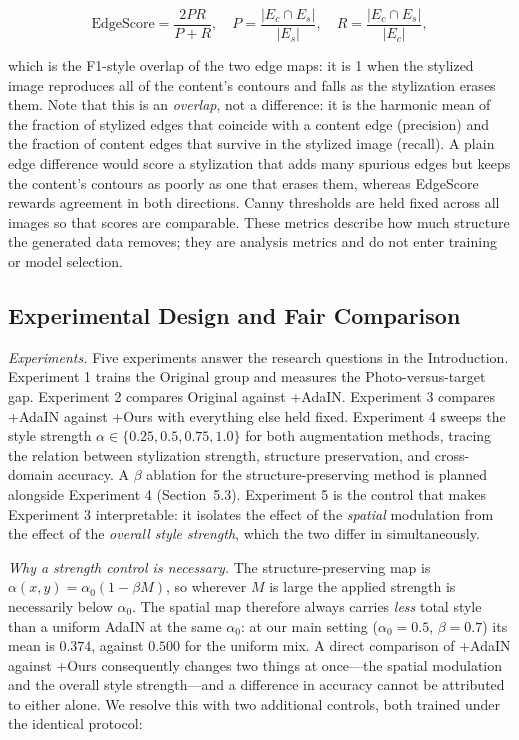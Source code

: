 \[
\text{EdgeScore} = \frac{2PR}{P+R}, \quad
P = \frac{|E_c \cap E_s|}{|E_s|}, \quad
R = \frac{|E_c \cap E_s|}{|E_c|},
\]

which is the F1-style overlap of the two edge maps: it is 1 when the stylized image reproduces all of the content's contours and falls as the stylization erases them. Note that this is an \textit{overlap}, not a difference: it is the harmonic mean of the fraction of stylized edges that coincide with a content edge (precision) and the fraction of content edges that survive in the stylized image (recall). A plain edge difference would score a stylization that adds many spurious edges but keeps the content's contours as poorly as one that erases them, whereas EdgeScore rewards agreement in both directions. Canny thresholds are held fixed across all images so that scores are comparable. These metrics describe how much structure the generated data removes; they are analysis metrics and do not enter training or model selection.


\subsection{Experimental Design and Fair Comparison}
\label{sec:exp_design}

\textit{Experiments.} Five experiments answer the research questions in the Introduction. Experiment 1 trains the Original group and measures the Photo-versus-target gap. Experiment 2 compares Original against +AdaIN. Experiment 3 compares +AdaIN against +Ours with everything else held fixed. Experiment 4 sweeps the style strength $\alpha \in \{0.25, 0.5, 0.75, 1.0\}$ for both augmentation methods, tracing the relation between stylization strength, structure preservation, and cross-domain accuracy. A $\beta$ ablation for the structure-preserving method is planned alongside Experiment 4 (Section~5.3). Experiment 5 is the control that makes Experiment 3 interpretable: it isolates the effect of the \emph{spatial} modulation from the effect of the \emph{overall style strength}, which the two differ in simultaneously.

\textit{Why a strength control is necessary.} The structure-preserving map is $\alpha(x,y) = \alpha_0(1-\beta M)$, so wherever $M$ is large the applied strength is necessarily below $\alpha_0$. The spatial map therefore always carries \emph{less} total style than a uniform AdaIN at the same $\alpha_0$: at our main setting ($\alpha_0 = 0.5$, $\beta = 0.7$) its mean is $0.374$, against $0.500$ for the uniform mix. A direct comparison of +AdaIN against +Ours consequently changes two things at once---the spatial modulation and the overall style strength---and a difference in accuracy cannot be attributed to either alone. We resolve this with two additional controls, both trained under the identical protocol:

